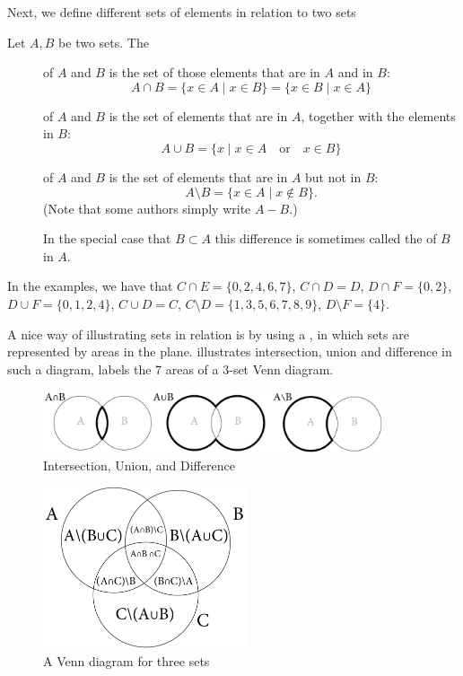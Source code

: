 Next, we define different sets of elements in relation to two sets
\begin{defn}
Let $A,B$ be two sets. The
\begin{description}
\item[] of $A$ and $B$ is the set of those elements
that are in $A$ and in $B$:
\[
A\cap B=\{x\in A\mid x\in B\}=\{x\in B\mid x\in A\}
\]
\item[] of $A$ and $B$ is the set of elements
that are in $A$, together with the elements in $B$:
\[
A\cup B=\{x\mid x\in A\quad\mbox{or}\quad x\in B\}
\]
\item[] of $A$ and $B$ is the set of elements that are in
$A$ but not in $B$:
\[
A\setminus B=\{x\in A\mid x\not\in B\}.
\]
(Note that some authors simply write $A-B$.)

In the special case that $B\subset A$ this difference is sometimes called
the  of $B$ in $A$.
\end{description}
\end{defn}
In the examples, we have that $C\cap E=\{0,2,4,6,7\}$, $C\cap D=D$, $D\cap
F=\{0,2\}$, $D\cup F=\{0,1,2,4\}$, $C\cup D=C$, $C\setminus
D=\{1,3,5,6,7,8,9\}$, $D\setminus F=\{4\}$.

A nice way of illustrating sets in relation is by using a , in which sets are represented by areas in the plane.
 illustrates intersection, union and difference in
such a diagram,  labels the 7 areas of a 3-set Venn
diagram.

\begin{figure}[t]
\begin{center}
\includegraphics[width=10cm]{pic/VennMulti.pdf}
\end{center}
\caption{Intersection, Union, and Difference}
\label{figvennmulti}
\end{figure}

\begin{figure}[t]
\begin{center}
\includegraphics[width=6cm]{pic/VennDiagram.pdf}
\end{center}
\caption{A Venn diagram for three sets}
\label{figvenndiag}
\end{figure}

